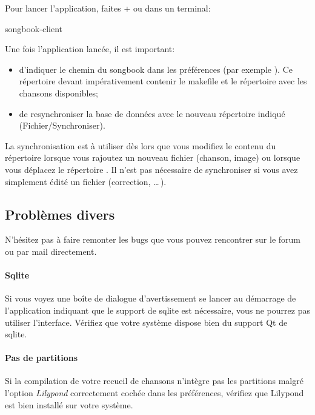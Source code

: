 \documentclass[versionenligne]{patacrep}
\newcommand{\Touche}[1]{\Ovalbox{#1}}
\begin{document}
Pour lancer l'application,
faites \Touche{Alt}+\Touche{F2}  ou dans un
terminal:
\begin{unixcom}
  songbook-client
\end{unixcom}

Une fois l'application lancée, il est important:
\begin{itemize}
\item d'indiquer le chemin du songbook dans les préférences (par
  exemple ). Ce répertoire devant impérativement
  contenir le makefile et le répertoire  avec les chansons
  disponibles;
\item de resynchroniser la base de données avec le nouveau répertoire
  indiqué (Fichier/Synchroniser).
\end{itemize}

\begin{nota}
  La synchronisation est à utiliser dès lors que vous modifiez le
  contenu du répertoire  lorsque vous rajoutez un nouveau
  fichier (chanson, image) ou lorsque vous déplacez le répertoire
  .  Il n'est pas nécessaire de synchroniser si vous
  avez simplement édité un fichier (correction, \dots\,).
\end{nota}

\subsection{Problèmes divers}

N'hésitez pas à faire remonter les bugs que vous pouvez rencontrer sur
le forum ou par mail directement. 

\paragraph{Sqlite} Si vous voyez une boîte de dialogue
d'avertissement se lancer au démarrage de l'application indiquant que
le support de sqlite est nécessaire, vous ne pourrez pas utiliser
l'interface. Vérifiez que votre système dispose bien du support Qt de sqlite.

\paragraph{Pas de partitions}
Si la compilation de votre recueil de chansons n'intègre pas les
partitions malgré l'option \emph{Lilypond} correctement cochée dans les
préférences, vérifiez que Lilypond est bien installé sur votre système. 
\end{document}
